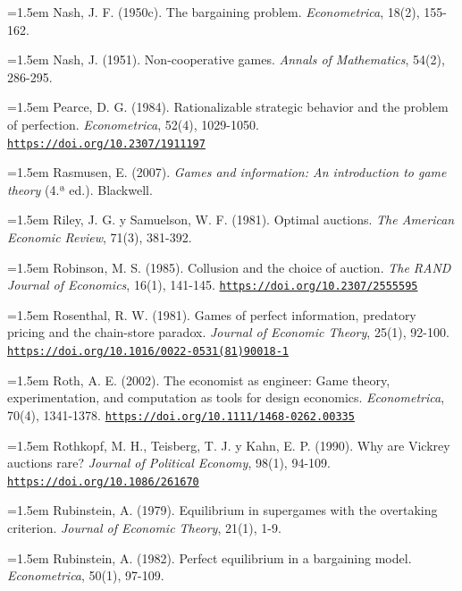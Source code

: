 \documentclass[10pt,a4paper]{article}
\begin{document}
\noindent\hangindent=1.5em Nash, J. F. (1950c). The bargaining problem. \textit{Econometrica}, 18(2), 155-162.

\noindent\hangindent=1.5em Nash, J. (1951). Non-cooperative games. \textit{Annals of Mathematics}, 54(2), 286-295.

\noindent\hangindent=1.5em Pearce, D. G. (1984). Rationalizable strategic behavior and the problem of perfection. \textit{Econometrica}, 52(4), 1029-1050. \href{https://doi.org/10.2307/1911197}{\nolinkurl{https://doi.org/10.2307/1911197}}

\noindent\hangindent=1.5em Rasmusen, E. (2007). \textit{Games and information: An introduction to game theory} (4.ª ed.). Blackwell.

\noindent\hangindent=1.5em Riley, J. G. y Samuelson, W. F. (1981). Optimal auctions. \textit{The American Economic Review}, 71(3), 381-392.

\noindent\hangindent=1.5em Robinson, M. S. (1985). Collusion and the choice of auction. \textit{The RAND Journal of Economics}, 16(1), 141-145. \href{https://doi.org/10.2307/2555595}{\nolinkurl{https://doi.org/10.2307/2555595}}

\noindent\hangindent=1.5em Rosenthal, R. W. (1981). Games of perfect information, predatory pricing and the chain-store paradox. \textit{Journal of Economic Theory}, 25(1), 92-100. \href{https://doi.org/10.1016/0022-0531(81)90018-1}{\nolinkurl{https://doi.org/10.1016/0022-0531(81)90018-1}}

\noindent\hangindent=1.5em Roth, A. E. (2002). The economist as engineer: Game theory, experimentation, and computation as tools for design economics. \textit{Econometrica}, 70(4), 1341-1378. \href{https://doi.org/10.1111/1468-0262.00335}{\nolinkurl{https://doi.org/10.1111/1468-0262.00335}}

\noindent\hangindent=1.5em Rothkopf, M. H., Teisberg, T. J. y Kahn, E. P. (1990). Why are Vickrey auctions rare? \textit{Journal of Political Economy}, 98(1), 94-109. \href{https://doi.org/10.1086/261670}{\nolinkurl{https://doi.org/10.1086/261670}}

\noindent\hangindent=1.5em Rubinstein, A. (1979). Equilibrium in supergames with the overtaking criterion. \textit{Journal of Economic Theory}, 21(1), 1-9.

\noindent\hangindent=1.5em Rubinstein, A. (1982). Perfect equilibrium in a bargaining model. \textit{Econometrica}, 50(1), 97-109.
\end{document}
